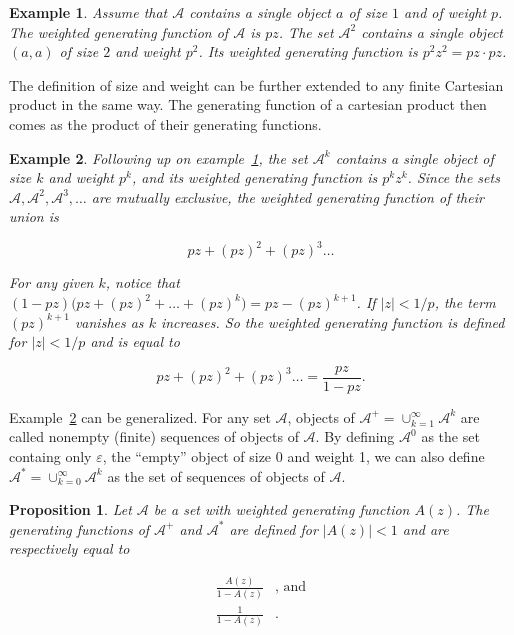 \documentclass{article}
\newtheorem{example}{Example}
\newtheorem{proposition}{Proposition}
\begin{document}
\begin{example}
\label{ex:simple}
Assume that $\mathcal{A}$ contains a single object $a$ of size $1$ and of
weight $p$. The weighted generating function of $\mathcal{A}$ is $pz$.
The set $\mathcal{A}^2$ contains a single object $(a,a)$ of size $2$ and
weight $p^2$. Its weighted generating function is $p^2z^2 = pz \cdot pz$.
\end{example}

The definition of size and weight can be further extended to any finite
Cartesian product in the same way. The generating function of a cartesian
product then comes as the product of their generating functions.

\begin{example}
\label{ex:sequences}
Following up on example~\ref{ex:simple}, the set $\mathcal{A}^k$ contains
a single object of size $k$ and weight $p^k$, and its weighted generating
function is $p^kz^k$. Since the sets $\mathcal{A}, \mathcal{A}^2,
\mathcal{A}^3,\ldots$ are mutually exclusive, the weighted generating
function of their union is

\begin{equation*}
pz + (pz)^2 + (pz)^3 \ldots
\end{equation*}

For any given $k$, notice that $(1-pz) \big(pz + (pz)^2 + \ldots + (pz)^k
\big) = pz-(pz)^{k+1}$.  If $|z| < 1/p$, the term $(pz)^{k+1}$ vanishes as
$k$ increases. So the weighted generating function is defined for $|z| <
1/p$ and is equal to

\begin{equation*}
pz + (pz)^2 + (pz)^3 \ldots = \frac{pz}{1-pz}.
\end{equation*}
\end{example}

Example~\ref{ex:sequences} can be generalized. For any set $\mathcal{A}$,
objects of $\mathcal{A}^+ = \cup_{k=1}^\infty\mathcal{A}^k$ are called
nonempty (finite) sequences of objects of $\mathcal{A}$. By defining
$\mathcal{A}^0$ as the set containg only $\varepsilon$, the ``empty''
object of size 0 and weight 1, we can also define $\mathcal{A}^* =
\cup_{k=0}^\infty\mathcal{A}^k$ as the set of sequences of objects of
$\mathcal{A}$.

\begin{proposition}
\label{th:sequences}
Let $\mathcal{A}$ be a set with weighted generating function $A(z)$. The
generating functions of $\mathcal{A}^+$ and $\mathcal{A}^*$ are defined
for $|A(z)| < 1$ and are respectively equal to

\begin{equation*}
\begin{split}
\frac{A(z)}{1-A(z)}&\text{, and} \\
\frac{1}{1-A(z)}&.
\end{split}
\end{equation*}
\end{proposition}
\end{document}
